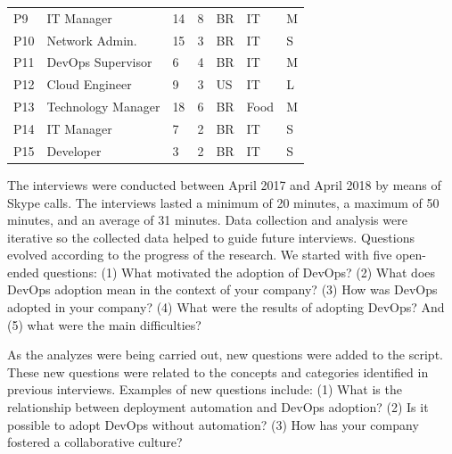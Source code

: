 \begin{table}[h!]
\begin{tabular}{p{0.5cm}p{4cm}p{0.4cm}p{0.45cm}p{0.5cm}p{1.8cm}p{0.3cm}}
P9                   & IT Manager            & 14           & 8           & BR            & IT                 & M                               \\ \centering

P10                  & Network Admin.        & 15           & 3           & BR            & IT                 & S                               \\ \centering

P11                  & DevOps Supervisor                & 6            & 4           & BR            & IT                  & M                               \\ \centering

P12                  & Cloud Engineer              & 9            & 3           & US            & IT                  & L                               \\ \centering

P13                  & Technology Manager                 & 18            & 6           & BR            & Food                  & M                               \\ \centering

P14                  & IT Manager            & 7            & 2           & BR            & IT                  & S                               \\ \centering

P15                  & Developer        & 3            & 2           & BR            & IT                  & S \\ \bottomrule
\end{tabular}
\end{table}



The interviews were conducted between April 2017 and April 2018 by means of Skype calls.
The interviews lasted a minimum of 20 minutes, a maximum of 50 minutes, and an average of 31 minutes.
Data collection and analysis were iterative so the collected data helped to guide
future interviews. Questions evolved according to
the progress of the research. We started with five open-ended questions: (1) What
motivated the adoption of DevOps? (2) What does DevOps adoption mean in the context of
your company? (3) How was DevOps adopted in your company? (4) What were the
results of adopting DevOps? And (5) what were the main difficulties?

As the analyzes were being carried out, new questions were added to the script.
These new questions were related to the concepts and categories identified in
previous interviews. Examples of new questions include: (1) What is the
relationship between deployment automation and DevOps adoption? (2) Is it
possible to adopt DevOps without automation? (3) How has your company fostered a
collaborative culture?

